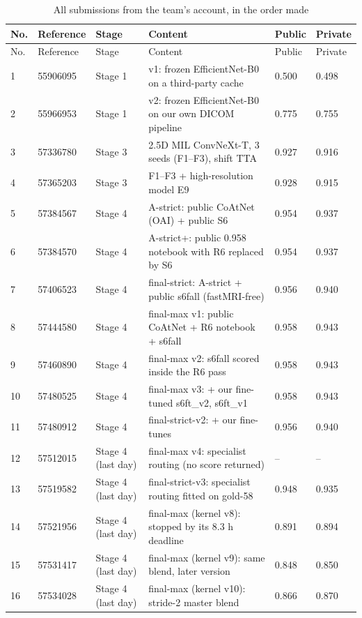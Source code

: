 \begin{longtable}{C{0.6cm}C{1.5cm}L{2.2cm}L{6.9cm}C{1.1cm}C{1.1cm}}
\caption{All submissions from the team's account, in the order made}\label{tab:allsubs}\\
\toprule
No. & Reference & Stage & Content & Public & Private \\
\midrule
\endfirsthead
\toprule
No. & Reference & Stage & Content & Public & Private \\
\midrule
{} & 55906095 & Stage 1 & v1: frozen EfficientNet-B0 on a third-party cache & 0.500 & 0.498 \\
2 & 55966953 & Stage 1 & v2: frozen EfficientNet-B0 on our own DICOM pipeline & 0.775 & 0.755 \\
3 & 57336780 & Stage 3 & 2.5D MIL ConvNeXt-T, 3 seeds (F1--F3), shift TTA & 0.927 & 0.916 \\
4 & 57365203 & Stage 3 & F1--F3 + high-resolution model E9 & 0.928 & 0.915 \\
5 & 57384567 & Stage 4 & A-strict: public CoAtNet (OAI) + public S6 & 0.954 & 0.937 \\
6 & 57384570 & Stage 4 & A-strict+: public 0.958 notebook with R6 replaced by S6 & 0.954 & 0.937 \\
7 & 57406523 & Stage 4 & final-strict: A-strict + public s6fall (fastMRI-free) & 0.956 & 0.940 \\
8 & 57444580 & Stage 4 & final-max v1: public CoAtNet + R6 notebook + s6fall & 0.958 & 0.943 \\
9 & 57460890 & Stage 4 & final-max v2: s6fall scored inside the R6 pass & 0.958 & 0.943 \\
10 & 57480525 & Stage 4 & final-max v3: + our fine-tuned s6ft\_v2, s6ft\_v1 & 0.958 & 0.943 \\
11 & 57480912 & Stage 4 & final-strict-v2: + our fine-tunes & 0.956 & 0.940 \\
12 & 57512015 & Stage 4 (last day) & final-max v4: specialist routing (no score returned) & -- & -- \\
13 & 57519582 & Stage 4 (last day) & final-strict-v3: specialist routing fitted on gold-58 & 0.948 & 0.935 \\
14 & 57521956 & Stage 4 (last day) & final-max (kernel v8): stopped by its 8.3 h deadline & 0.891 & 0.894 \\
15 & 57531417 & Stage 4 (last day) & final-max (kernel v9): same blend, later version & 0.848 & 0.850 \\
16 & 57534028 & Stage 4 (last day) & final-max (kernel v10): stride-2 master blend & 0.866 & 0.870 \\

\end{longtable}
